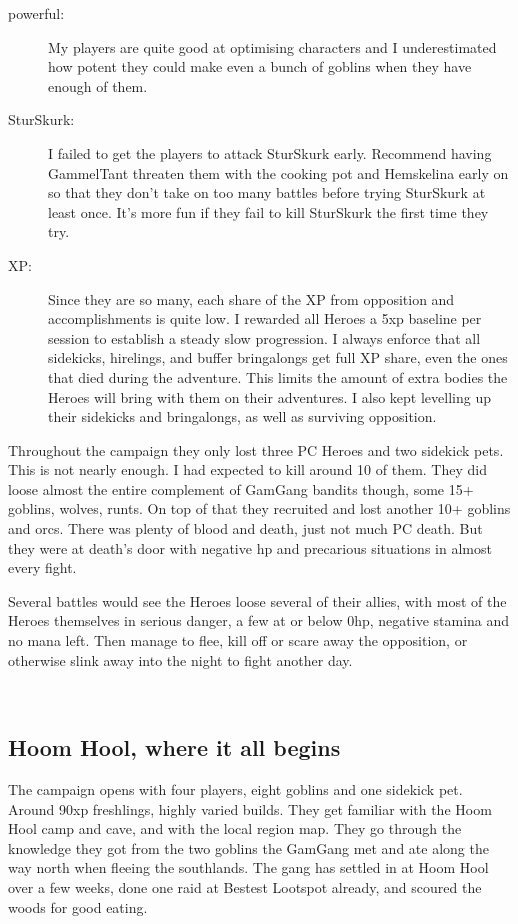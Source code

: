 \begin{description}
    \item[powerful:] My players are quite good at optimising characters and I underestimated how potent they could make even a bunch of goblins when they have enough of them.

    \item[SturSkurk:] I failed to get the players to attack SturSkurk early. Recommend having GammelTant threaten them with the cooking pot and Hemskelina early on so that they don't take on too many battles before trying SturSkurk at least once. It's more fun if they fail to kill SturSkurk the first time they try.
    
    \item[XP:] Since they are so many, each share of the XP from opposition and accomplishments is quite low. I rewarded all Heroes a 5xp baseline per session to establish a steady slow progression. I always enforce that all sidekicks, hirelings, and buffer bringalongs get full XP share, even the ones that died during the adventure. This limits the amount of extra bodies the Heroes will bring with them on their adventures. I also kept levelling up their sidekicks and bringalongs, as well as surviving opposition.

\end{description}

\noindent Throughout the campaign they only lost three PC Heroes and two sidekick pets. This is not nearly enough. I had expected to kill around 10 of them. They did loose almost the entire complement of GamGang bandits though, some 15+ goblins, wolves, runts. On top of that they recruited and lost another 10+ goblins and orcs. There was plenty of blood and death, just not much PC death. But they were at death's door with negative hp and precarious situations in almost every fight.

Several battles would see the Heroes loose several of their allies, with most of the Heroes themselves in serious danger, a few at or below 0hp, negative stamina and no mana left. Then manage to flee, kill off or scare away the opposition, or otherwise slink away into the night to fight another day.

\


\subsection*{Hoom Hool, where it all begins}                            %

The campaign opens with four players, eight goblins and one sidekick pet. Around 90xp freshlings, highly varied builds. They get familiar with the Hoom Hool camp and cave, and with the local region map. They go through the knowledge they got from the two goblins the GamGang met and ate along the way north when fleeing the southlands. The gang has settled in at Hoom Hool over a few weeks, done one raid at Bestest Lootspot already, and scoured the woods for good eating.

